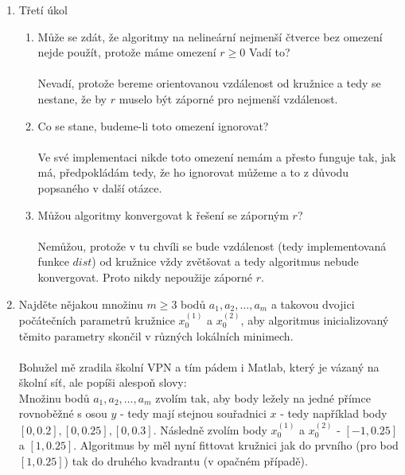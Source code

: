 \documentclass[12pt]{article}
\begin{document}
\begin{enumerate}
	\item Třetí úkol
	\begin{enumerate}[label=\arabic*)]
		\item 
		Může se zdát, že algoritmy na nelineární nejmenší čtverce bez omezení 
		nejde použít, protože máme omezení $r\ge0$ Vadí to? 
		\\ \\
		Nevadí, protože bereme orientovanou vzdálenost od kružnice a tedy se 
		nestane, že by $r$ muselo být záporné pro nejmenší vzdálenost.
		\item
		Co se stane, budeme-li toto omezení ignorovat? 
		\\ \\
		Ve své implementaci nikde toto omezení nemám a přesto funguje tak, jak má, 
		předpokládám tedy, že ho ignorovat můžeme a to z důvodu popsaného v další
		otázce.
		\item 
		Můžou algoritmy konvergovat k řešení se záporným $r$? 
		\\ \\
		Nemůžou, protože v tu chvíli se bude vzdálenost (tedy implementovaná
		funkce $dist$) od kružnice vždy zvětšovat a tedy algoritmus nebude 
		konvergovat. Proto nikdy nepoužije záporné $r$.
	\end{enumerate}
	\item Najděte nějakou množinu $m\ge3$ bodů $a_1, a_2, \ldots, a_m$ a takovou
	 dvojici počátečních parametrů kružnice $x^{(1)}_0$ a $x^{(2)}_0$, aby 
	 algoritmus inicializovaný těmito parametry skončil v různých lokálních 
	 minimech. 
	 \\ \\
	 Bohužel mě zradila školní VPN a tím pádem i Matlab, který je vázaný na 
	 školní síť, ale popíši alespoň slovy:
	 \\
	 Množinu bodů $a_1, a_2, \ldots, a_m$ zvolím tak, aby body ležely na jedné 
	 přímce rovnoběžné s osou $y$ - tedy mají stejnou souřadnici $x$ - tedy 
	 například body $[0, 0.2], [0, 0.25], [0, 0.3]$. Následně zvolím body 
	 $x^{(1)}_0$ a $x^{(2)}_0$ - $[-1, 0.25]$ a $[1, 0.25]$. Algoritmus by měl nyní 
	 fittovat kružnici jak do prvního (pro bod $[1, 0.25]$) tak do druhého 
	 kvadrantu (v opačném případě).
\end{enumerate}
\end{document}
